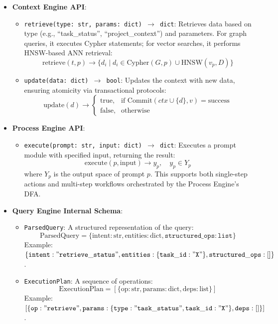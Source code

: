 \documentclass[11pt]{article}
\begin{document}
\begin{itemize}
    \item \textbf{Context Engine API}:
        \begin{itemize}
            \item \texttt{retrieve(type: str, params: dict) $\rightarrow$ dict}: Retrieves data based on type (e.g., “task\_status”, “project\_context”) and parameters. For graph queries, it executes Cypher statements; for vector searches, it performs HNSW-based ANN retrieval:
                \[
                \text{retrieve}(t, p) \rightarrow \{ d_i \mid d_i \in \text{Cypher}(G, p) \cup \text{HNSW}(v_p, D) \}
                \]
            \item \texttt{update(data: dict) $\rightarrow$ bool}: Updates the context with new data, ensuring atomicity via transactional protocols:
                \[
                \text{update}(d) \rightarrow \begin{cases}
                \text{true}, & \text{if } \text{Commit}(ctx \cup \{ d \}, v) = \text{success} \\
                \text{false}, & \text{otherwise}
                \end{cases}
                \]
        \end{itemize}

    \item \textbf{Process Engine API}:
        \begin{itemize}
            \item \texttt{execute(prompt: str, input: dict) $\rightarrow$ dict}: Executes a prompt module with specified input, returning the result:
                \[
                \text{execute}(p, \text{input}) \rightarrow y_p, \quad y_p \in Y_p
                \]
                where \( Y_p \) is the output space of prompt \( p \). This supports both single-step actions and multi-step workflows orchestrated by the Process Engine’s DFA.
        \end{itemize}

    \item \textbf{Query Engine Internal Schema}:
        \begin{itemize}
            \item \texttt{ParsedQuery}: A structured representation of the query:
                \[
                \text{ParsedQuery} = \{ \text{intent}: \text{str}, \text{entities}: \text{dict}, \mathtt{structured\_ops}: \mathtt{list} \}
                \]
                Example: \( \{ \mathtt{intent}: \mathtt{"retrieve\_status"}, \mathtt{entities}: \{ \mathtt{task\_id}: \mathtt{"X"} \}, \mathtt{structured\_ops}: [] \} \).
            \item \texttt{ExecutionPlan}: A sequence of operations:
                \[
                \text{ExecutionPlan} = [ \{ \text{op}: \text{str}, \text{params}: \text{dict}, \text{deps}: \text{list} \} ]
                \]
                Example: \( [ \{ \mathtt{op}: \mathtt{"retrieve"}, \mathtt{params}: \{ \mathtt{type}: \mathtt{"task\_status"}, \mathtt{task\_id}: \mathtt{"X"} \}, \mathtt{deps}: [] \} ] \).
        \end{itemize}
\end{itemize}
\end{document}

